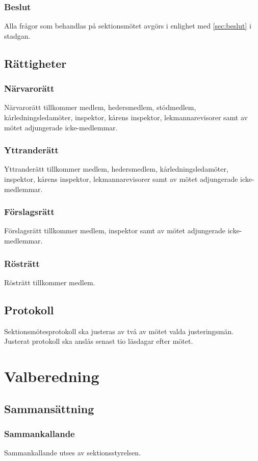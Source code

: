 \documentclass[a4paper]{dtek}
\begin{document}
\subsubsection{Beslut}
Alla frågor som behandlas på sektionsmötet avgörs i enlighet med \ref{sec:beslut} i stadgan.
\subsection{Rättigheter}
\subsubsection{Närvarorätt}
Närvarorätt tillkommer medlem, hedersmedlem, stödmedlem, kårledningsledamöter, inspektor, kårens inspektor, lekmannarevisorer samt av mötet adjungerade icke-medlemmar.
\subsubsection{Yttranderätt}
Yttranderätt tillkommer medlem, hedersmedlem, kårledningsledamöter, inspektor, kårens inspektor, lekmannarevisorer samt av mötet adjungerade icke-medlemmar.
\subsubsection{Förslagsrätt}
Förslagsrätt tillkommer medlem, inspektor samt av mötet adjungerade icke-medlemmar.
\subsubsection{Rösträtt}
Rösträtt tillkommer medlem.
\subsection{Protokoll}
Sektionsmötesprotokoll ska justeras av två av mötet valda justeringsmän. Justerat protokoll ska anslås senast tio läsdagar efter mötet.
\newpage

\section{Valberedning}
\label{sec:valberedning}
\subsection{Sammansättning}
\subsubsection{Sammankallande}
Sammankallande utses av sektionsstyrelsen.
\end{document}
